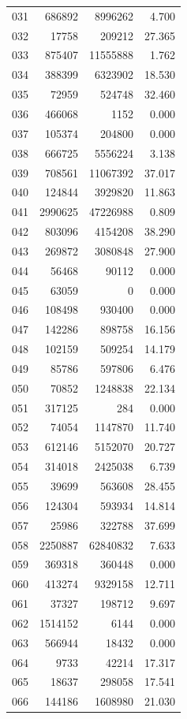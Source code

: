 \documentclass[anonymous,notoc]{gmcm2026}
\begin{document}
\begin{longtable}{lrrr}
031 & 686892 & 8996262 & 4.700 \\
032 & 17758 & 209212 & 27.365 \\
033 & 875407 & 11555888 & 1.762 \\
034 & 388399 & 6323902 & 18.530 \\
035 & 72959 & 524748 & 32.460 \\
036 & 466068 & 1152 & 0.000 \\
037 & 105374 & 204800 & 0.000 \\
038 & 666725 & 5556224 & 3.138 \\
039 & 708561 & 11067392 & 37.017 \\
040 & 124844 & 3929820 & 11.863 \\
041 & 2990625 & 47226988 & 0.809 \\
042 & 803096 & 4154208 & 38.290 \\
043 & 269872 & 3080848 & 27.900 \\
044 & 56468 & 90112 & 0.000 \\
045 & 63059 & 0 & 0.000 \\
046 & 108498 & 930400 & 0.000 \\
047 & 142286 & 898758 & 16.156 \\
048 & 102159 & 509254 & 14.179 \\
049 & 85786 & 597806 & 6.476 \\
050 & 70852 & 1248838 & 22.134 \\
051 & 317125 & 284 & 0.000 \\
052 & 74054 & 1147870 & 11.740 \\
053 & 612146 & 5152070 & 20.727 \\
054 & 314018 & 2425038 & 6.739 \\
055 & 39699 & 563608 & 28.455 \\
056 & 124304 & 593934 & 14.814 \\
057 & 25986 & 322788 & 37.699 \\
058 & 2250887 & 62840832 & 7.633 \\
059 & 369318 & 360448 & 0.000 \\
060 & 413274 & 9329158 & 12.711 \\
061 & 37327 & 198712 & 9.697 \\
062 & 1514152 & 6144 & 0.000 \\
063 & 566944 & 18432 & 0.000 \\
064 & 9733 & 42214 & 17.317 \\
065 & 18637 & 298058 & 17.541 \\
066 & 144186 & 1608980 & 21.030 \\

\end{longtable}
\end{document}
